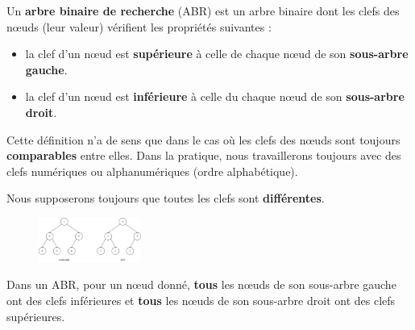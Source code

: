 \documentclass[
  a4paper,
  DIV=11,
  numbers=noendperiod]{scrartcl}
\providecommand{\tightlist}{%
  \setlength{\itemsep}{0pt}\setlength{\parskip}{0pt}}\usepackage{longtable,booktabs,array}
\begin{document}
\begin{tcolorbox}[enhanced jigsaw, opacitybacktitle=0.6, title=\textcolor{quarto-callout-tip-color}{\faLightbulb}\hspace{0.5em}{Définition}, coltitle=black, left=2mm, breakable, opacityback=0, bottomtitle=1mm, colback=white, leftrule=.75mm, rightrule=.15mm, bottomrule=.15mm, titlerule=0mm, arc=.35mm, colbacktitle=quarto-callout-tip-color!10!white, toprule=.15mm, toptitle=1mm]

Un \textbf{arbre binaire de recherche} (ABR) est un arbre binaire dont
les clefs des nœuds (leur valeur) vérifient les propriétés suivantes :

\begin{itemize}
\tightlist
\item
  la clef d'un nœud est \textbf{supérieure} à celle de chaque nœud de
  son \textbf{sous-arbre gauche}.
\item
  la clef d'un nœud est \textbf{inférieure} à celle du chaque nœud de
  son \textbf{sous-arbre droit}.
\end{itemize}

\end{tcolorbox}

Cette définition n'a de sens que dans le cas où les clefs des nœuds sont
toujours \textbf{comparables} entre elles. Dans la pratique, nous
travaillerons toujours avec des clefs numériques ou alphanumériques
(ordre alphabétique).

Nous supposerons toujours que toutes les clefs sont
\textbf{différentes}.

\begin{figure}

{\centering \includegraphics[width=0.3\textwidth,height=\textheight]{ABR.png}

}

\end{figure}

\begin{tcolorbox}[enhanced jigsaw, opacitybacktitle=0.6, title=\textcolor{quarto-callout-note-color}{\faInfo}\hspace{0.5em}{Remarque}, coltitle=black, left=2mm, breakable, opacityback=0, bottomtitle=1mm, colback=white, leftrule=.75mm, rightrule=.15mm, bottomrule=.15mm, titlerule=0mm, arc=.35mm, colbacktitle=quarto-callout-note-color!10!white, toprule=.15mm, toptitle=1mm]

Dans un ABR, pour un nœud donné, \textbf{tous} les nœuds de son
sous-arbre gauche ont des clefs inférieures et \textbf{tous} les nœuds
de son sous-arbre droit ont des clefs supérieures.

\end{tcolorbox}
\end{document}
